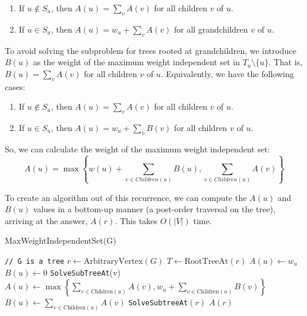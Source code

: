 \documentclass [12pt]{article}
\theoremstyle{definition}
\begin{document}
\begin{enumerate}
    \item If $u \notin S_u$, then $A(u) = \sum_{v} A(v )$ for all children $v$ of $u$.
    \item If $u \in S_u$, then $A(u) = w_u + \sum_{v} A(v )$ for all grandchildren $v$ of $u$. 
\end{enumerate}

To avoid solving the subproblem for trees rooted at grandchildren, we introduce $B(u)$ as the weight of the maximum weight independent set in $T_u \setminus \{u\}$. That is, $B(u) = \sum_{v} A(v )$ for all children $v$ of $u$. Equivalently, we have the following cases: 

\begin{enumerate}
    \item If $u \notin S_u$, then $A(u) = \sum_{v} A(v )$ for all children $v$ of $u$.
    \item If $u \in S_u$, then $A(u) = w_u + \sum_{v} B(v )$ for all children $v$ of $u$. 
\end{enumerate}

So, we can calculate the weight of the maximum weight independent set:
$$
A(u) = \max\left\{w(u) + \sum_{v \in Children(u)} B(u), \sum_{v \in Children(u)} A(v)  \right\}
$$

To create an algorithm out of this recurrence, we can compute the $A(u)$ and $B(u)$ values in a bottom-up manner (a post-order traversal on the tree), arriving at the answer, $A(r)$. This
takes $O(|V|)$ time.




\begin{algorithm}
\caption{MaxWeightIndependentSet(G)}
\label{alg:MaxWeightIndependentSet}
\begin{algorithmic}
\State \texttt{// G is a tree}
\State $r \gets \text{ArbitraryVertex}(G)$
\State $T \gets \text{RootTreeAt}(r)$
    \State {} {
        \State $A(u) \gets w_u$
        \State $B(u) \gets 0$
    }{
        \State {} {
            \State \texttt{SolveSubTreeAt}(v)
        }
        \State $A(u) \gets \max\left\{\sum_{v \in \text{Children}(u)} A(v), w_u + \sum_{v \in \text{Children}(u)} B(v) \right\}$
        \State $B(u) \gets \sum_{v \in \text{Children}(u)} A(v)$
    }
\EndProcedure
\State \texttt{SolveSubtreeAt}$(r)$
\State \Return $A(r)$
\end{algorithmic}
\end{algorithm}
\end{document}
